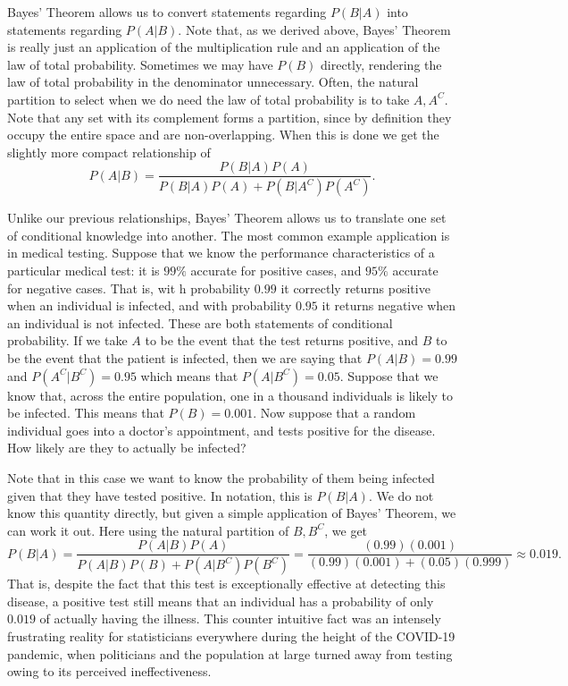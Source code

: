 \documentclass[
  letterpaper,
  DIV=11,
  numbers=noendperiod]{scrreprt}
\begin{document}
Bayes' Theorem allows us to convert statements regarding \(P(B|A)\) into
statements regarding \(P(A|B)\). Note that, as we derived above, Bayes'
Theorem is really just an application of the multiplication rule and an
application of the law of total probability. Sometimes we may have
\(P(B)\) directly, rendering the law of total probability in the
denominator unnecessary. Often, the natural partition to select when we
do need the law of total probability is to take \(A,A^C\). Note that any
set with its complement forms a partition, since by definition they
occupy the entire space and are non-overlapping. When this is done we
get the slightly more compact relationship of
\[P(A|B) = \frac{P(B|A)P(A)}{P(B|A)P(A) + P(B|A^C)P(A^C)}.\]

Unlike our previous relationships, Bayes' Theorem allows us to translate
one set of conditional knowledge into another. The most common example
application is in medical testing. Suppose that we know the performance
characteristics of a particular medical test: it is \(99\%\) accurate
for positive cases, and \(95\%\) accurate for negative cases. That is,
wit h probability \(0.99\) it correctly returns positive when an
individual is infected, and with probability \(0.95\) it returns
negative when an individual is not infected. These are both statements
of conditional probability. If we take \(A\) to be the event that the
test returns positive, and \(B\) to be the event that the patient is
infected, then we are saying that \(P(A|B) = 0.99\) and
\(P(A^C|B^C) = 0.95\) which means that \(P(A|B^C) = 0.05\). Suppose that
we know that, across the entire population, one in a thousand
individuals is likely to be infected. This means that \(P(B) = 0.001\).
Now suppose that a random individual goes into a doctor's appointment,
and tests positive for the disease. How likely are they to actually be
infected?

Note that in this case we want to know the probability of them being
infected given that they have tested positive. In notation, this is
\(P(B|A)\). We do not know this quantity directly, but given a simple
application of Bayes' Theorem, we can work it out. Here using the
natural partition of \(B,B^C\), we get
\[P(B|A) = \frac{P(A|B)P(A)}{P(A|B)P(B)+P(A|B^C)P(B^C)} = \frac{(0.99)(0.001)}{(0.99)(0.001)+(0.05)(0.999)} \approx 0.019.\]
That is, despite the fact that this test is exceptionally effective at
detecting this disease, a positive test still means that an individual
has a probability of only \(0.019\) of actually having the illness. This
counter intuitive fact was an intensely frustrating reality for
statisticians everywhere during the height of the COVID-19 pandemic,
when politicians and the population at large turned away from testing
owing to its perceived ineffectiveness.
\end{document}
